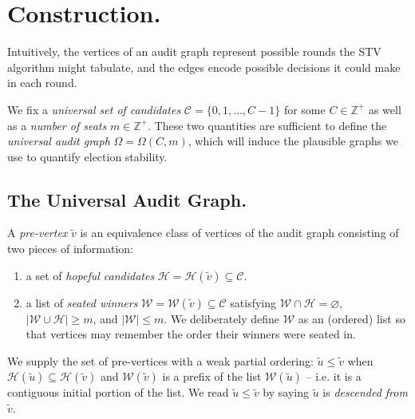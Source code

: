\renewcommand{\subset}{\subseteq}

\newcommand{\PPPP}{\mathscr{P}}

\newcommand{\CCC}{\mathcal{C}}
\newcommand{\EEE}{\mathcal{E}}
\newcommand{\HHH}{\mathcal{H}}
\newcommand{\WWW}{\mathcal{W}}
\newcommand{\VS}{\mathcal{VS}}
\newcommand{\SSS}{\mathcal{S}}
\newcommand{\LLL}{\mathcal{L}}
\newcommand{\OOO}{\mathcal{O}}

\newcommand{\MPT}{\mathsf{MPT}}

\newcommand{\ZZ}{\mathbb{Z}}
\newcommand{\RR}{\mathbb{R}}
\newcommand{\NN}{\mathbb{N}}

\newcommand{\tv}{\tilde{v}}
\newcommand{\tu}{\tilde{u}}
\newcommand{\ve}{\vec{e}}
\newcommand{\ov}{\overline{v}}
\newcommand{\ou}{\overline{u}}
\newcommand{\oO}{\overline{\Omega}}
\let\vec\relax\newcommand{\vec}[1]{\mathaccent"017E\relax{#1}}

\section{Construction.}
Intuitively, the vertices of an audit graph represent possible rounds the STV algorithm might tabulate, and the edges encode possible decisions it could make in each round.

We fix a \emph{universal set of candidates} $\CCC = \{0,1,\ldots, C-1\}$ for some $C\in \ZZ^+$ as well as a \emph{number of seats} $m\in \ZZ^+$. 
These two quantities are sufficient to define the \emph{universal audit graph} $\Omega = \Omega(C,m)$, which will induce the plausible graphs we use to quantify election stability.
\subsection{The Universal Audit Graph.}
A \emph{pre-vertex} $\tv$ is an equivalence class of vertices of the audit graph consisting of two pieces of information:
\begin{enumerate}
	\item a set of \emph{hopeful candidates} $\HHH = \HHH(\tv)\subset \CCC$.
	\item a list of \emph{seated winners} $\WWW = \WWW(\tv)\subset\CCC$ satisfying $\WWW\cap\HHH = \varnothing$, $|\WWW\cup\HHH|\geq m$, and $|\WWW|\leq m$. We deliberately define $\WWW$ as an (ordered) list so that vertices may remember the order their winners were seated in.
\end{enumerate}
We supply the set of pre-vertices with a weak partial ordering: $\tu\leq\tv$ when $\HHH(\tu)\subset\HHH(\tv)$ and $\WWW(\tv)$ is a prefix of the list $\WWW(\tu)$ -- i.e. it is a contiguous initial portion of the list. 
We read $\tu\leq \tv$ by saying $\tu$ is \emph{descended from} $\tv$.

